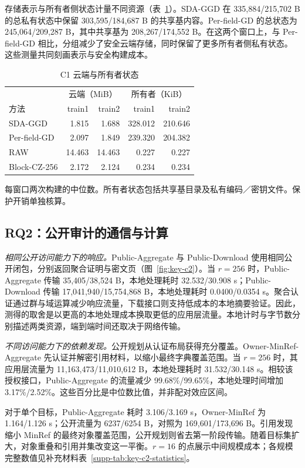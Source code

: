 \documentclass[10pt,journal]{IEEEtran}
\newcommand{\tabnote}[1]{\par\smallskip\parbox{\linewidth}{\footnotesize #1}}
\begin{document}
存储表示与所有者侧状态计量不同资源（表~\ref{tab:state}）。SDA-GGD 在 335,884/215,702 B 的总私有状态中保留 303,595/184,687 B 的共享基内容。Per-field-GD 的总状态为 245,064/209,287 B，其中共享基为 208,267/174,552 B。在这两个窗口上，与 Per-field-GD 相比，分组减少了安全云端存储，同时保留了更多所有者侧私有状态。这些测量共同刻画表示与安全构建成本。

\begin{table}[t]\centering\small
\caption{C1 云端与所有者状态}\label{tab:state}
\begin{tabular}{@{}lrrrr@{}}\toprule
& \multicolumn{2}{c}{云端（MiB）} & \multicolumn{2}{c}{所有者（KiB）}\\
方法 & train1 & train2 & train1 & train2\\\midrule
SDA-GGD & 1.815 & 1.688 & 328.012 & 210.646\\
Per-field-GD & 2.097 & 1.849 & 239.320 & 204.382\\
RAW & 14.463 & 14.463 & 0.227 & 0.227\\
Block-CZ-256 & 2.172 & 2.124 & 0.234 & 0.234\\
\bottomrule\end{tabular}
\tabnote{每窗口两次构建的中位数。所有者状态包括共享基目录及私有编码／密钥文件。保护开销单独核算。}
\end{table}

\subsection{RQ2：公开审计的通信与计算}
\emph{相同公开访问能力下的响应。}Public-Aggregate 与 Public-Download 使用相同公开闭包，分别返回聚合证明与密文页（图~\ref{fig:key-c2}）。当 $r=256$ 时，Public-Aggregate 传输 35,405/38,524 B，本地处理耗时 32.532/30.908 s；Public-Download 传输 17,041,940/15,754,868 B，本地处理耗时 0.0400/0.0354 s。聚合认证通过群与域运算减少响应流量，下载接口则支持低成本的本地摘要验证。因此，测得的取舍是以更高的本地处理成本换取更低的应用层流量。本地计时与字节数分别描述两类资源，端到端时间还取决于网络传输。

\emph{不同访问能力下的依赖发现。}公开规划从认证布局获得充分覆盖。Owner-MinRef-Aggregate 先认证并解密引用材料，以缩小最终字典覆盖范围。当 $r=256$ 时，其应用层流量为 11,163,473/11,010,612 B，本地处理耗时 31.532/30.148 s。相较该授权接口，Public-Aggregate 的流量减少 99.68\%/99.65\%，本地处理时间增加 3.17\%/2.52\%。这些百分比是中位数比值，并非配对效应区间。

对于单个目标，Public-Aggregate 耗时 3.106/3.169 s，Owner-MinRef 为 1.164/1.126 s；公开流量为 6237/6254 B，对照为 169,601/173,696 B。引用发现缩小 MinRef 的最终对象覆盖范围，公开规划则省去第一阶段传输。随着目标集扩大，对象重叠和引用并集改变这一平衡。$r=16$ 的点展示中间规模成本；各规模完整数值见补充材料表~\ref*{supp-tab:key-c2-statistics}。
\end{document}
